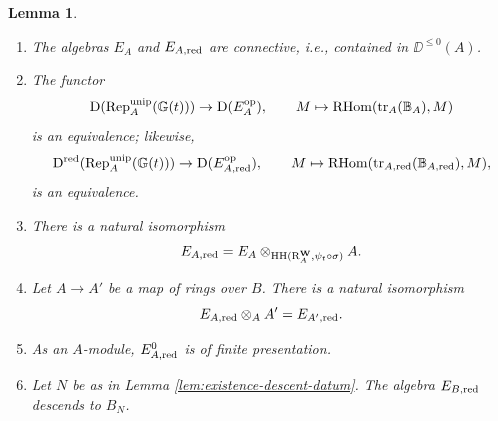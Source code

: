 \documentclass[a4paper, 10pt, oneside, reqno]{amsart}
\theoremstyle{plain}
\newtheorem{lem}[thm]{Lemma}
\theoremstyle{definition}
\theoremstyle{remark}
\newcommand{\Gbb}{\mathbb{G}}
\newcommand{\RR}{\mathrm{R}}
\newcommand{\opp}{\mathrm{op}}
\newcommand{\HHH}{\mathrm{HH}}
\begin{document}
\begin{lem}\label{lem:main-lemma-generator-of-trace}
\begin{enumerate}
\item The algebras $E_A$ and $E_{A, \mathrm{red}}$ are connective, i.e., contained in $\DD^{\leq 0}(A)$.
\item The functor 
$$\DD(\Rep_{A}^{\unip}(\Gbb(t))) \rightarrow \DD(E_A^{\opp}), \qquad M \mapsto \RHom(\tr_A(\mathbb{B}_A), M)$$
is an equivalence; likewise, 
$$\DD^{\red}(\Rep_{A}^{\unip}(\Gbb(t))) \rightarrow \DD(E_{A, \red}^{\opp}), \qquad M \mapsto \RHom(\tr_{A, \red}(\mathbb{B}_{A, \red}), M),$$
is an equivalence. 
\item There is a natural isomorphism 
$$E_{A, \red} = E_A \otimes_{\HHH(\RR_{A}^{\Wbf}, \psi_t \circ \sigma)} A.$$ 
\item Let $A \to A'$ be a map of rings over $B$. There is a natural isomorphism 
$$E_{A, \mathrm{red}} \otimes_{A} A' = E_{A',\mathrm{red}}.$$
\item As an $A$-module, $E_{A,\mathrm{red}}^0$ is of finite presentation.
\item Let $N$ be as in Lemma \ref{lem:existence-descent-datum}. The algebra $E_{B,\mathrm{red}}$ descends to $B_N$. 
\end{enumerate}
\end{lem}
\end{document}
